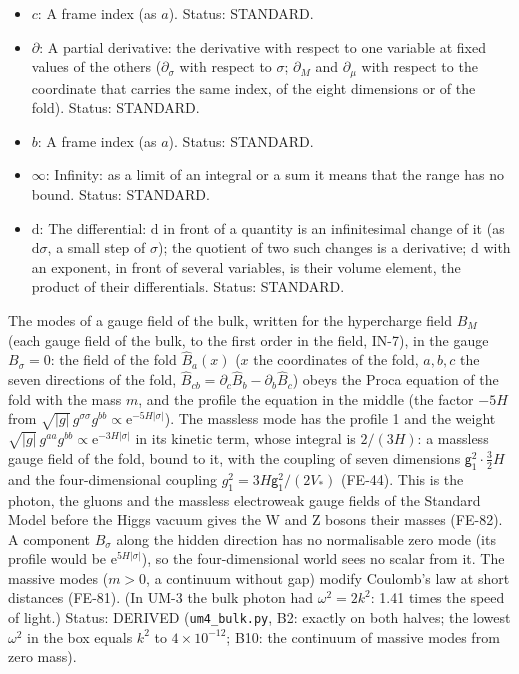 \documentclass[
  10pt,
]{article}
\begin{document}
\begin{itemize}
  \(\eta_{ab}\): The flat metric of the frame,
  \(\eta = \mathrm{diag}(1, 1, 1, 1, -1, -1, -1, -1)\) (eta4488 of
  4+4.nb); \(\eta^{ab}\) is its inverse (the same matrix). Unit:
  dimensionless. Status: AUTHOR.
\item
  \(c\): A frame index (as \(a\)). Status: STANDARD.
\item
  \(\partial\): A partial derivative: the derivative with respect to one
  variable at fixed values of the others (\(\partial_\sigma\) with
  respect to \(\sigma\); \(\partial_M\) and \(\partial_\mu\) with
  respect to the coordinate that carries the same index, of the eight
  dimensions or of the fold). Status: STANDARD.
\item
  \(b\): A frame index (as \(a\)). Status: STANDARD.
\item
  \(\infty\): Infinity: as a limit of an integral or a sum it means that
  the range has no bound. Status: STANDARD.
\item
  \(\mathrm{d}\): The differential: \(\mathrm{d}\) in front of a
  quantity is an infinitesimal change of it (as \(\mathrm{d}\sigma\), a
  small step of \(\sigma\)); the quotient of two such changes is a
  derivative; \(\mathrm{d}\) with an exponent, in front of several
  variables, is their volume element, the product of their
  differentials. Status: STANDARD.
\end{itemize}

The modes of a gauge field of the bulk, written for the hypercharge
field \(B_M\) (each gauge field of the bulk, to the first order in the
field, IN-7), in the gauge \(B_\sigma = 0\): the field of the fold
\(\hat B_a(x)\) (\(x\) the coordinates of the fold, \(a, b, c\) the
seven directions of the fold,
\(\hat B_{cb} = \partial_c\hat B_b - \partial_b\hat B_c\)) obeys the
Proca equation of the fold with the mass \(m\), and the profile the
equation in the middle (the factor \(-5H\) from
\(\sqrt{\lvert g\rvert}\,g^{\sigma\sigma}g^{bb} \propto \mathrm{e}^{-5H\lvert\sigma\rvert}\)).
The massless mode has the profile 1 and the weight
\(\sqrt{\lvert g\rvert}\,g^{aa}g^{bb} \propto \mathrm{e}^{-3H\lvert\sigma\rvert}\)
in its kinetic term, whose integral is \(2/(3H)\): a massless gauge
field of the fold, bound to it, with the coupling of seven dimensions
\(\mathsf{g}_1^2\cdot\frac32H\) and the four-dimensional coupling
\(g_1^2 = 3H\mathsf{g}_1^2/(2V_*)\) (FE-44). This is the photon, the
gluons and the massless electroweak gauge fields of the Standard Model
before the Higgs vacuum gives the W and Z bosons their masses (FE-82). A
component \(B_\sigma\) along the hidden direction has no normalisable
zero mode (its profile would be \(\mathrm{e}^{5H\lvert\sigma\rvert}\)),
so the four-dimensional world sees no scalar from it. The massive modes
(\(m > 0\), a continuum without gap) modify Coulomb's law at short
distances (FE-81). (In UM-3 the bulk photon had \(\omega^2 = 2k^2\):
1.41 times the speed of light.) Status: DERIVED (\texttt{um4\_bulk.py},
B2: exactly on both halves; the lowest \(\omega^2\) in the box equals
\(k^2\) to \(4\times10^{-12}\); B10: the continuum of massive modes from
zero mass).
\end{document}
